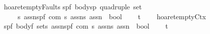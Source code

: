 \begin{isabellebody}
\isanewline
\isanewline
\isanewline
{\isachardoublequoteopen}{\isacharunderscore}hoaret{\isacharunderscore}emptyFaults{\isachardoublequoteclose}{\isacharcolon}{\isacharcolon}\isanewline
{\isachardoublequoteopen}{\isacharbrackleft}{\isacharparenleft}{\isacharprime}s{\isacharcomma}{\isacharprime}p{\isacharcomma}{\isacharprime}f{\isacharparenright}\ body{\isacharcomma}{\isacharparenleft}{\isacharprime}s{\isacharcomma}{\isacharprime}p{\isacharparenright}\ quadruple\ set{\isacharcomma}\isanewline
\ \ \ \ {\isacharprime}s\ assn{\isacharcomma}{\isacharparenleft}{\isacharprime}s{\isacharcomma}{\isacharprime}p{\isacharcomma}{\isacharprime}f{\isacharparenright}\ com{\isacharcomma}\ {\isacharprime}s\ assn{\isacharcomma}{\isacharprime}s\ assn{\isacharbrackright}\ {\isacharequal}{\isachargreater}\ bool{\isachardoublequoteclose}\isanewline
\ \ \ \ {\isacharparenleft}{\isachardoublequoteopen}{\isacharparenleft}{}{\isacharunderscore}{\isacharcomma}{\isacharunderscore}{\isacharslash}{\isasymturnstile}\isactrlsub t\ {\isacharparenleft}{\isacharunderscore}{\isacharslash}\ {\isacharparenleft}{\isacharunderscore}{\isacharparenright}{\isacharslash}\ {\isacharunderscore}{\isacharcomma}{\isacharslash}{\isacharunderscore}{\isacharparenright}{\isacharparenright}{\isachardoublequoteclose}\ {\isacharbrackleft}{}{}{\isacharcomma}{}{}{\isacharcomma}{}{}{}{}{\isacharcomma}{}{}{\isacharcomma}{}{}{}{}{\isacharcomma}{}{}{}{}{\isacharbrackright}{}{}{\isacharparenright}\isanewline
\isanewline
{\isachardoublequoteopen}{\isacharunderscore}hoaret{\isacharunderscore}emptyCtx{\isachardoublequoteclose}{\isacharcolon}{\isacharcolon}\isanewline
{\isachardoublequoteopen}{\isacharbrackleft}{\isacharparenleft}{\isacharprime}s{\isacharcomma}{\isacharprime}p{\isacharcomma}{\isacharprime}f{\isacharparenright}\ body{\isacharcomma}{\isacharprime}f\ set{\isacharcomma}{\isacharprime}s\ assn{\isacharcomma}{\isacharparenleft}{\isacharprime}s{\isacharcomma}{\isacharprime}p{\isacharcomma}{\isacharprime}f{\isacharparenright}\ com{\isacharcomma}\ {\isacharprime}s\ assn{\isacharcomma}{\isacharprime}s\ assn{\isacharbrackright}\ {\isacharequal}{\isachargreater}\ bool{\isachardoublequoteclose}\isanewline
\ \ \ \ {\isacharparenleft}{\isachardoublequoteopen}{\isacharparenleft}{}{\isacharunderscore}{\isacharslash}{\isasymturnstile}\isactrlsub t\isactrlbsub {\isacharprime}{\isacharslash}{\isacharunderscore}\isactrlesub \ {\isacharparenleft}{\isacharunderscore}{\isacharslash}\ {\isacharparenleft}{\isacharunderscore}{\isacharparenright}{\isacharslash}\ {\isacharunderscore}{\isacharcomma}{\isacharslash}{\isacharunderscore}{\isacharparenright}{\isacharparenright}{\isachardoublequoteclose}\ {\isacharbrackleft}{}{}{\isacharcomma}{}{}{\isacharcomma}{}{}{}{}{\isacharcomma}{}{}{\isacharcomma}{}{}{}{}{\isacharcomma}{}{}{}{}{\isacharbrackright}{}{}{\isacharparenright}\isanewline

\end{isabellebody}
